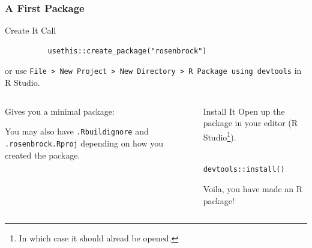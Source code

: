 \documentclass[aspectratio=1610,onlytextwidth]{beamer}
\begin{document}
\begin{frame}[c,fragile]
  \frametitle{A First Package}
  \begin{block}{Create It}
    Call
    \begin{lstlisting}
          usethis::create_package("rosenbrock")
        \end{lstlisting}
    or use \texttt{File > New Project > New Directory > R Package using devtools} in R Studio.
  \end{block}

  \pause\bigskip

  \begin{columns}[T]
    \begin{column}{0.45\textwidth}
      Gives you a \alert{minimal} package:

      \medskip


      \medskip\pause

      You may also have \texttt{.Rbuildignore} and \texttt{.rosenbrock.Rproj}
      depending on how you created the package.
    \end{column}

    \pause

    \begin{column}{0.45\textwidth}
      \begin{block}{Install It}
        Open up the package in your editor (R Studio\footnote{In which case it
          should alread be opened.}).
        \begin{lstlisting}
          devtools::install()
        \end{lstlisting}

        \bigskip

        Voila, you have made an R package!
      \end{block}
    \end{column}
  \end{columns}

\end{frame}
\end{document}
